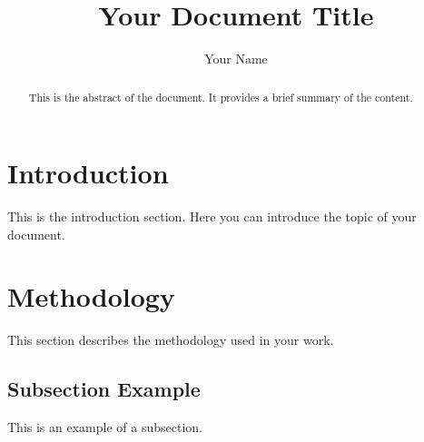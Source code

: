\documentclass[a4paper,12pt]{article}
\title{Your Document Title}
\author{Your Name}
\begin{document}
\maketitle

\begin{abstract}
This is the abstract of the document. It provides a brief summary of the content.
\end{abstract}

\tableofcontents
\newpage

\section{Introduction}
This is the introduction section. Here you can introduce the topic of your document.

\section{Methodology}
This section describes the methodology used in your work.

\subsection{Subsection Example}
This is an example of a subsection.
\end{document}
